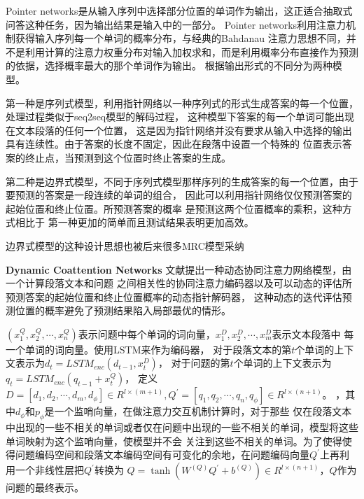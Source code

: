 Pointer networks是从输入序列中选择部分位置的单词作为输出，这正适合抽取式问答这种任务，因为输出结果是输入中的一部分。
Pointer networks利用注意力机制获得输入序列每一个单词的概率分布，与经典的Bahdanau
注意力思想不同，并不是利用计算的注意力权重分布对输入加权求和，而是利用概率分布直接作为预测的依据，选择概率最大的那个单词作为输出。
根据输出形式的不同分为两种模型。

第一种是序列式模型，利用指针网络以一种序列式的形式生成答案的每一个位置，处理过程类似于seq2seq模型的解码过程，
这种模型下答案的每一个单词可能出现在文本段落的任何一个位置，
这是因为指针网络并没有要求从输入中选择的输出具有连续性。由于答案的长度不固定，因此在段落中设置一个特殊的
位置表示答案的终止点，当预测到这个位置时终止答案的生成。

第二种是边界式模型，不同于序列式模型那样序列的生成答案的每一个位置，由于要预测的答案是一段连续的单词的组合，
因此可以利用指针网络仅仅预测答案的起始位置和终止位置。所预测答案的概率
是预测这两个位置概率的乘积，这种方式相比于
第一种更加的简单而且测试结果表明更加高效。




边界式模型的这种设计思想也被后来很多MRC模型采纳



\textbf{\kaishu{} Dynamic Coattention Networks}
文献提出一种动态协同注意力网络模型，由一个计算段落文本和问题
之间相关性的协同注意力编码器以及可以动态的评估所预测答案的起始位置和终止位置概率的动态指针解码器，
这种动态的迭代评估预测位置的概率避免了预测结果陷入局部最优的情形。

$(x_1^Q,x_2^Q,\cdots,x_n^Q)$表示问题中每个单词的词向量，$x_1^D,x_2^D,\cdots,x_m^D$表示文本段落中
每一个单词的词向量。使用LSTM来作为编码器，
对于段落文本的第$t$个单词的上下文表示为$d_t=LSTM_{enc}(d_{t-1},x_t^D)$，
对于问题的第$t$个单词的上下文表示为$q_t=LSTM_{enc}(q_{t-1}+x_t^Q)$，
定义$D=[d_1,d_2,\cdots,d_m,d_{\phi}] \in R^{l\times(m+1)},Q^{'}=[q_1,q_2,\cdots,q_n,q_{\phi}] \in R^{l\times(n+1)}$。
，其中$d_{\phi}$和$p_{\phi}$是一个监哨向量，在做注意力交互机制计算时，对于那些
仅在段落文本中出现的一些不相关的单词或者仅在问题中出现的一些不相关的单词，模型将这些单词映射为这个监哨向量，使模型并不会
关注到这些不相关的单词。为了使得使得问题编码空间和段落文本编码空间有可变化的余地，在问题编码向量$Q^{'}$上再利用一个非线性层把$Q^{'}$转换为
$Q=\tanh(W^(Q)Q^{'}+b^{(Q)})\in R^{l\times(n+1)}$，$Q$作为问题的最终表示。

